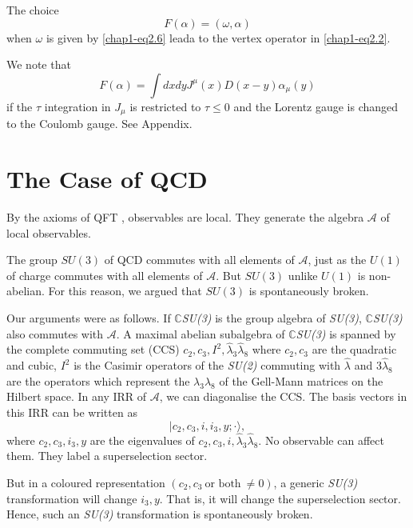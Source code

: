 The choice
\begin{equation}
F(\alpha) = (\omega, \alpha) \label{chap1-eq2.33}
\end{equation}
when $\omega$ is given by \eqref{chap1-eq2.6} leada to the vertex operator in \eqref{chap1-eq2.2}.

We note that
\begin{equation}
F(\alpha) = \int dx dy {J}^\mu (x) {D}(x-y) \alpha_\mu (y) \label{chap1-eq2.34}
\end{equation}
if the $\tau$ integration in ${J}_\mu$ is restricted to $\tau \leq 0$ and the Lorentz gauge is changed to the Coulomb gauge. See Appendix.

\section{The Case of QCD}\label{chap1-sec3}

By the axioms of QFT \cite{key9}, observables are local. They generate the algebra $\mathcal{A}$ of local observables.

The group $SU(3)$ of QCD commutes with all elements of $\mathcal{A}$, just as the $U(1)$ of charge commutes with all elements of  $\mathcal{A}$. But $SU(3)$ unlike $U(1)$ is non-abelian. For this reason, we argued \cite{key1, key4} that $SU(3)$ is spontaneously broken.

Our arguments were as follows. If $\mathbb{C}$\textit{SU(3)} is the group algebra of \textit{SU(3)}, $\mathbb{C}$\textit{SU(3)} also commutes with $\mathcal{A}$. A maximal abelian subalgebra of $\mathbb{C}$\textit{SU(3)} is spanned by the complete commuting set (CCS) $c_2, c_3, I^{2}, \hat{\lambda}_3 \hat{\lambda}_8$ where $c_2, c_3$ are the quadratic and cubic, $I^{2}$ is the Casimir operators of the \textit{SU(2)} commuting with $\hat{\lambda}$ and $3 \hat{\lambda}_8$ are the operators which represent the ${\lambda}_3 {\lambda}_8$ of the Gell-Mann matrices on the Hilbert space. In any IRR of $\mathcal{A}$, we can diagonalise the CCS. The basis vectors in this IRR can be written as
\begin{equation}
  |c_2, c_3, i, i_3, y;\cdot \rangle,\label{chap1-eq3.1}
\end{equation}
where $c_2, c_3, i_3, y$ are the eigenvalues of $c_2, c_3, i, \hat{\lambda}_3 \hat{\lambda}_8$. No observable can affect them. They label a superselection sector.

But in a coloured representation $(c_2, c_3 ~\text{or both}~\neq 0)$, a generic \textit{SU(3)} transformation will change $i_3, y$. That is, it will change the superselection sector. Hence, such an \textit{SU(3)} transformation is spontaneously broken.

